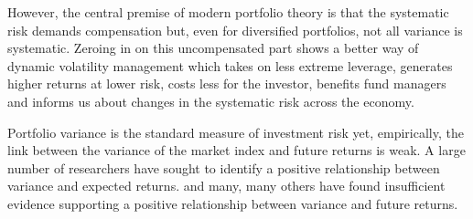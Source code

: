 However, the central premise of modern portfolio theory is that the systematic risk demands compensation but, even for diversified portfolios, not all variance is systematic. \citet{markowitz_portfolio_1952} Zeroing in on this uncompensated part shows a better way of dynamic volatility management which takes on less extreme leverage, generates higher returns at lower risk, costs less for the investor, benefits fund managers and informs us about changes in the systematic risk across the economy. 

Portfolio variance is the standard measure of investment risk yet, empirically, the link between the variance of the market index and future returns is weak. A large number of researchers have sought to identify a positive relationship between variance and expected returns. \citet{haugen_1972,FRENCH19873,glosten_1993,ang_cross-section_2006} and many, many others have found insufficient evidence supporting a positive relationship between variance and future returns. 

